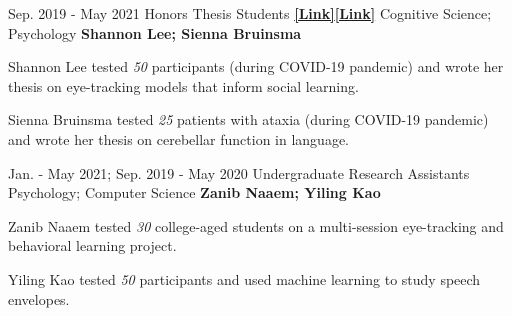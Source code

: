 

\begin{cventries}
 

  \cventry
    {Sep. 2019 - May 2021} %
    {Honors Thesis Students {\href{https://drive.google.com/file/d/1uhIOkii0y0wMr63KSzlhi7k7NqLEuFlU/view?usp=sharing}{\textbf{[Link]}}\href{https://docs.google.com/presentation/d/1GmuGhTJFQFXBuVG_8zfoTIu2ForG47HIdeSV-09GFe8/edit?usp=sharing}{\textbf{[Link]}}}} %
    {Cognitive Science; Psychology} %
    {\textbf{Shannon Lee; Sienna Bruinsma}} 
    {
      \begin{cvitems} %
        \item {Shannon Lee tested \textit{50} participants (during COVID-19 pandemic) and wrote her thesis on eye-tracking models that inform social learning.}
        \item {Sienna Bruinsma tested \textit{25} patients with ataxia (during COVID-19 pandemic) and wrote her thesis on cerebellar function in language.}
      \end{cvitems}
    }
    
    
  \cventry
    {Jan. - May 2021; Sep. 2019 - May 2020} %
    {Undergraduate Research Assistants} %
    {Psychology; Computer Science}
   	{\textbf{Zanib Naaem; Yiling Kao}}
    {
      \begin{cvitems} %
        \item {Zanib Naaem tested \textit{30} college-aged students on a multi-session eye-tracking and behavioral learning project.}
        \item {Yiling Kao tested \textit{50} participants and used machine learning to study speech envelopes.}
      \end{cvitems}
    }
    

\end{cventries}
